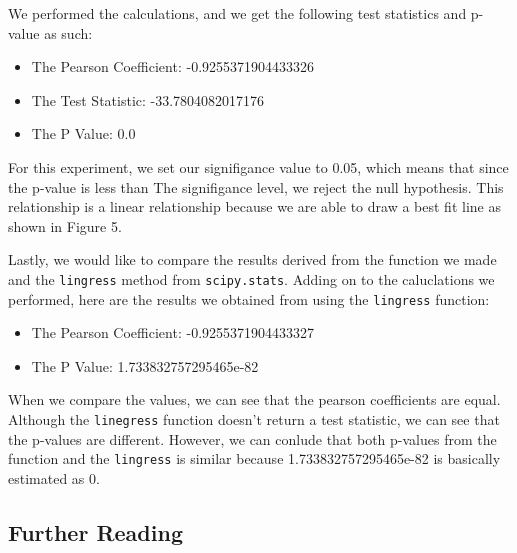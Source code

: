 \documentclass[a4paper, twocolumn]{article}
\begin{document}
We performed the calculations, and we get the following test statistics and p-value as such:
\begin{itemize}
    \item The Pearson Coefficient:  -0.9255371904433326
    \item The Test Statistic:  -33.7804082017176  
    \item The P Value:  0.0
\end{itemize}

For this experiment, we set our signifigance value to 0.05, which means that since the p-value is less than The
signifigance level, we reject the null hypothesis. This relationship is a linear relationship because we
are able to draw a best fit line as shown in Figure 5. 

Lastly, we would like to compare the results derived from the function we made and the \texttt{lingress} method from
\texttt{scipy.stats}. Adding on to the caluclations we performed, here are the results we obtained from using the 
\texttt{lingress} function:

\begin{itemize}
    \item The Pearson Coefficient:  -0.9255371904433327  
    \item The P Value:  1.733832757295465e-82
\end{itemize}

When we compare the values, we can see that the pearson coefficients are equal. Although the \texttt{linegress}
function doesn't return a test statistic, we can see that the p-values are different. However, we can conlude that
both p-values from the function and the \texttt{lingress} is similar because 1.733832757295465e-82 is basically 
estimated as 0.

\subsection{Further Reading}
\end{document}
